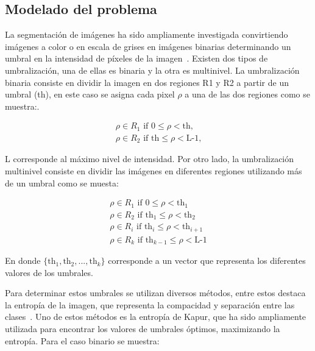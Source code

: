 \documentclass[conference]{IEEEtran}
\begin{document}
\subsection{Modelado del problema}

\noindent La segmentación de imágenes ha sido ampliamente investigada convirtiendo imágenes a color o en escala de grises en imágenes binarias determinando un umbral en la intensidad de píxeles de la imagen~\cite{Sankur2004}. Existen dos tipos de umbralización, una de ellas es binaria y la otra es multinivel. La umbralización binaria consiste en dividir la imagen en dos regiones R1 y R2 a partir de un umbral (th), en este caso se asigna cada pixel $\rho$ a una de las dos regiones como se muestra:.

\begin{equation}
\begin{gathered}
\rho \in R_1 \text{ if } 0 \leq \rho < \text{th,} \\
\rho \in R_2 \text{ if } \text{th} \leq \rho < \text{L-1,}
\end{gathered}
\label{eq1}
\end{equation}

\noindent L corresponde al máximo nivel de intensidad.
Por otro lado, la umbralización multinivel consiste en dividir las imágenes en diferentes regiones utilizando más de un umbral como se muesta:

\begin{equation}
\begin{gathered}
\rho \in R_1 \text{ if } 0 \leq \rho < \text{th}_1 \\
\rho \in R_2 \text{ if } \text{th}_1 \leq \rho < \text{th}_2 \\
\rho \in R_i \text{ if } \text{th}_i \leq \rho < \text{th}_{i+1} \\
\rho \in R_k \text{ if } \text{th}_{k-1} \leq \rho < \text{L-1}
\end{gathered}
\label{eq2}
\end{equation}

\noindent En donde $\{\text{th}_1,\text{th}_2,...,\text{th}_k\}$ corresponde a un vector que representa los diferentes valores de los umbrales.

\noindent Para determinar estos umbrales se utilizan diversos métodos, entre estos destaca la entropía de la imagen, que representa la compacidad y separación entre las clases~\cite{Pun1980}. Uno de estos métodos es la entropía de Kapur, que ha sido ampliamente utilizada para encontrar los valores de umbrales óptimos, maximizando la entropía. Para el caso binario se muestra:
\end{document}
